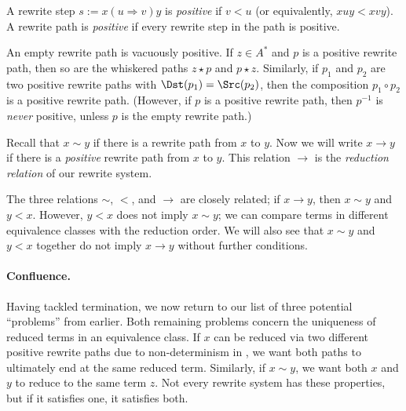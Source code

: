 \documentclass[../generics]{subfiles}
\begin{document}
\begin{definition}
A rewrite step $s := x(u\Rightarrow v)y$ is \emph{positive} if $v<u$ (or equivalently, $xuy<xvy$). A rewrite path is \emph{positive} if every rewrite step in the path is positive.
\end{definition}
An empty rewrite path is vacuously positive. If $z\in A^*$ and $p$ is a positive rewrite path, then so are the whiskered paths $z\star p$ and $p\star z$. Similarly, if $p_1$ and $p_2$ are two positive rewrite paths with $\Dst(p_1)=\Src(p_2)$, then the composition $p_1\circ p_2$ is a positive rewrite path. (However, if $p$ is a positive rewrite path, then $p^{-1}$ is \emph{never} positive, unless $p$ is the empty rewrite path.)
\begin{definition}
Recall that $x\sim y$ if there is a rewrite path from $x$ to $y$. Now we will write $x\rightarrow y$ if there is a \emph{positive} rewrite path from $x$ to $y$. This relation \index{$\rightarrow$}$\rightarrow$ is the \emph{reduction relation} of our rewrite system.
\end{definition}

The three relations $\sim$, $<$, and $\rightarrow$ are closely related; if $x\rightarrow y$, then $x\sim y$ and $y<x$. However, $y<x$ does not imply $x\sim y$; we can compare terms in different equivalence classes with the reduction order. We will also see that $x\sim y$ and $y<x$ together do not imply $x\rightarrow y$ without further conditions.

\paragraph{Confluence.}
Having tackled termination, we now return to our list of three potential ``problems'' from earlier. Both remaining problems concern the uniqueness of reduced terms in an equivalence class. If $x$ can be reduced via two different positive rewrite paths due to non-determinism in , we want both paths to ultimately end at the same reduced term. Similarly, if $x\sim y$, we want both $x$ and $y$ to reduce to the same term $z$. Not every rewrite system has these properties, but if it satisfies one, it satisfies both.
\end{document}

